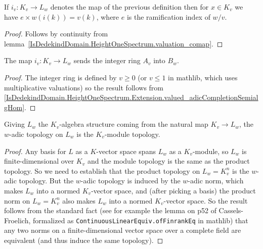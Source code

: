 \begin{lemma}
  \label{IsDedekindDomain.HeightOneSpectrum.Extension.valued_adicCompletionSemialgHom}
  \leanok
  If $i_v:K_v\to L_w$ denotes the map of the previous definition
  then for $x\in K_v$ we have
  $e\times w(i(k))=v(k)$, where $e$ is the ramification index of $w/v$.
\end{lemma}
\begin{proof}
  \leanok
  Follows by continuity from lemma~\ref{IsDedekindDomain.HeightOneSpectrum.valuation_comap}.
\end{proof}

\begin{lemma}
  \label{IsDedekindDomain.HeightOneSpectrum.Extension.adicCompletionSemialgHom_image_adicCompletionIntegers}
  \leanok
  The map $i_v:K_v\to L_w$ sends the integer ring $A_v$ into $B_w$.
\end{lemma}
\begin{proof}
  \leanok
  The integer ring is defined by $v\geq0$ (or $v\leq 1$ in mathlib, which uses multiplicative
  valuations) so the result follows from \ref{IsDedekindDomain.HeightOneSpectrum.Extension.valued_adicCompletionSemialgHom}.
\end{proof}
\begin{theorem}
  \label{IsDedekindDomain.HeightOneSpectrum.adicCompletion.instIsModuleTopology}
  \leanok
  Giving $L_w$ the $K_v$-algebra structure coming from the natural map $K_v\to L_w$,
  the $w$-adic topology on $L_w$ is the $K_v$-module topology.
\end{theorem}
\begin{proof}
  Any basis for $L$ as a $K$-vector space spans $L_w$ as a $K_v$-module, so $L_w$ is
  finite-dimensional over $K_v$ and the module topology is the same as the product
  topology. So we need to establish that the product topology on $L_w=K_v^n$ is
  the $w$-adic topology. But the $w$-adic topology is induced by the $w$-adic norm,
  which makes $L_w$ into a normed $K_v$-vector space, and (after picking a basis)
  the product norm on $L_w=K_v^n$ also makes $L_w$ into a normed $K_v$-vector space.
  So the result follows from the standard fact (see for example the lemma on p52
  of Cassels-Froelich, formalized as {\tt ContinuousLinearEquiv.ofFinrankEq} in mathlib)
  that any two norms on a finite-dimensional vector space over
  a complete field are equivalent (and thus induce the same topology).
\end{proof}

